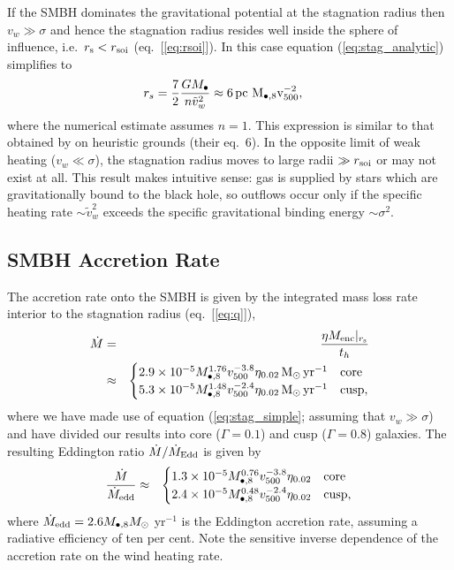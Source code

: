 \documentclass[usenatbib,fleqn]{mn2e}
\newcommand{\eddr}{\dot{M}/\dot{M}_{\rm Edd}}
\newcommand{\rs}{r_s}
\newcommand{\pc}{\rm pc}
\newcommand{\Menc}{M_{\rm enc}}
\newcommand{\Mbh}[1][]{M_{\bullet#1}}
\newcommand{\Mbheight}{M_{\bullet,8}}
\newcommand{\pyear}{{\rm yr}^{-1}}
\renewcommand{\th}{t_h}
\begin{document}
If the SMBH dominates the gravitational potential at the stagnation radius then $v_{w} \gg \sigma$ and hence the stagnation radius resides well inside the sphere of influence, i.e.~$r_{\rm s} < r_{\rm soi}$ (eq.~[\ref{eq:rsoi}]).  In this case equation (\ref{eq:stag_analytic}) simplifies to
\begin{align}
  &\rs=\frac{7}{2}\frac{G \Mbh}{n \tilde{v}_{w}^{2}} \approx 6
 \, \pc \,\, \Mbheight v_{500}^{-2},
  \label{eq:stag_simple}
\end{align}
where the numerical estimate assumes $n = 1$.  This expression is similar to that obtained by \citet{Volonteri+11} on heuristic grounds (their eq.~6).  In the opposite limit of weak heating ($v_{w} \ll \sigma$), the stagnation radius moves to large radii $\gg r_{\rm soi}$ or may not exist at all.  This result makes intuitive sense: gas is supplied by stars which are gravitationally bound to the black hole, so outflows occur only if the specific heating rate $\sim \tilde{v}_{w}^{2}$ exceeds the specific gravitational binding energy $\sim \sigma^{2}$.


\subsection{SMBH Accretion Rate}

The accretion rate onto the SMBH is given by the integrated mass loss rate interior to the stagnation radius (eq.~[\ref{eq:q}]), 
\begin{eqnarray}
  \dot{M} &=& \frac{\eta \Menc|_{r_{\rm s}}}{\th} \nonumber \\
&\approx&
  \begin{cases}
    2.9 \times 10^{-5} M_{\bullet,8}^{1.76}
    v_{500}^{-3.8}  \eta_{0.02} \Msun \, \pyear& \text{core} \\
    5.3 \times 10^{-5} M_{\bullet,8}^{1.48} 
    v_{500}^{-2.4}  \eta_{0.02} \Msun \, \pyear  & \text{cusp}, 
  \end{cases}
  \label{eq:mdot_analytic}
\end{eqnarray}
where we have made use of equation (\ref{eq:stag_simple}; assuming that $v_{w} \gg \sigma$) and have divided our results into core ($\Gamma = 0.1$) and cusp ($\Gamma = 0.8$) galaxies.  The resulting Eddington ratio $\eddr$ is given by 
\begin{eqnarray}
\frac{\dot{M}}{\dot{M}_{\rm edd}} &\approx&
  \begin{cases}
    1.3 \times 10^{-5} M_{\bullet,8}^{0.76}
    v_{500}^{-3.8}  \eta_{0.02}   & \text{core} \\
    2.4 \times 10^{-5} \Mbheight^{0.48} 
    v_{500}^{-2.4}  \eta_{0.02}   & \text{cusp}, 
  \end{cases}
  \label{eq:eddr_analytic}
\end{eqnarray}
where $\dot{M}_{\rm edd} = 2.6M_{\bullet,8}M_{\odot}$ yr$^{-1}$  is the Eddington accretion rate, assuming a radiative efficiency of ten per cent.  Note the sensitive inverse dependence of the accretion rate on the wind heating rate.  
\end{document}
